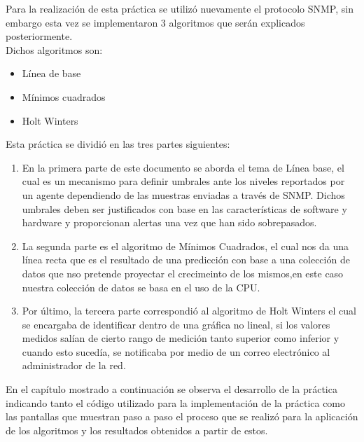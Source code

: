 Para la realización de esta práctica se utilizó nuevamente el protocolo SNMP, sin embargo esta vez se implementaron 3 algoritmos que serán explicados posteriormente.\\
Dichos algoritmos son:
\begin{itemize}
\item Línea de base
\item Mínimos cuadrados
\item Holt Winters
\end{itemize} 

Esta práctica se dividió en las tres partes siguientes:
\begin{enumerate}
\item En la primera parte de este documento se aborda el tema de Línea base, el cual es un mecanismo para definir umbrales ante los niveles reportados por un agente dependiendo de las muestras enviadas a través de SNMP. Dichos umbrales deben ser justificados con base en las características de software y hardware y proporcionan alertas una vez que han sido sobrepasados.
\item La segunda parte es el algoritmo de Mínimos Cuadrados, el cual nos da una línea recta que es el resultado de una predicción con base a una colección de datos que nso pretende proyectar el crecimeinto de los mismos,en este caso nuestra colección de datos se basa en el uso de la CPU.
\item Por último, la tercera parte correspondió al algoritmo de Holt Winters el cual se encargaba de identificar dentro de una gráfica no lineal, si los valores medidos salían de cierto rango de medición tanto superior como inferior y cuando esto sucedía, se notificaba por medio de un correo electrónico al administrador de la red.
\end{enumerate}

En el capítulo mostrado a continuación se observa el desarrollo de la práctica indicando tanto el código utilizado para la implementación de la práctica como las pantallas que muestran paso a paso el proceso que se realizó para la aplicación de los algoritmos y los resultados obtenidos a partir de estos.



 